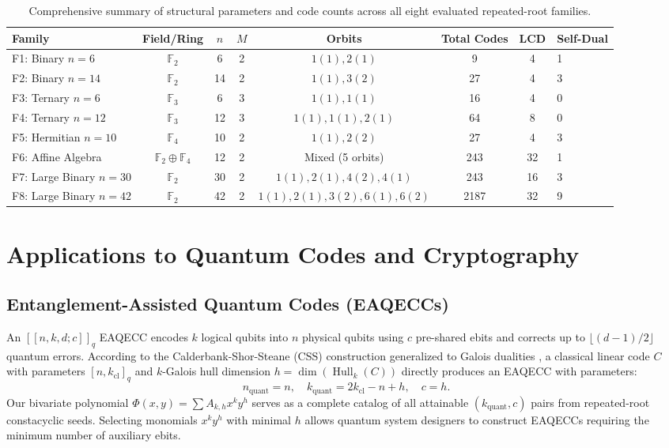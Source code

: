\documentclass[preprint,12pt]{elsarticle}
\numberwithin{equation}{section}
\theoremstyle{plain}
\theoremstyle{definition}
\theoremstyle{remark}
\begin{document}
\begin{table}[htbp]
\centering
\small
\caption{Comprehensive summary of structural parameters and code counts across all eight evaluated repeated-root families.}
\label{tab:summary_all}
\begin{tabularx}{\linewidth}{lccccccC{1.8cm}}
\toprule
\textbf{Family} & \textbf{Field/Ring} & $n$ & $M$ & \textbf{Orbits} & \textbf{Total Codes} & \textbf{LCD} & \textbf{Self-Dual} \\
\midrule
F1: Binary $n=6$ & $\mathbb{F}_2$ & 6 & 2 & $1(1), 2(1)$ & 9 & 4 & 1 \\
F2: Binary $n=14$ & $\mathbb{F}_2$ & 14 & 2 & $1(1), 3(2)$ & 27 & 4 & 3 \\
F3: Ternary $n=6$ & $\mathbb{F}_3$ & 6 & 3 & $1(1), 1(1)$ & 16 & 4 & 0 \\
F4: Ternary $n=12$ & $\mathbb{F}_3$ & 12 & 3 & $1(1), 1(1), 2(1)$ & 64 & 8 & 0 \\
F5: Hermitian $n=10$ & $\mathbb{F}_4$ & 10 & 2 & $1(1), 2(2)$ & 27 & 4 & 3 \\
F6: Affine Algebra & $\mathbb{F}_2 \oplus \mathbb{F}_4$ & 12 & 2 & Mixed (5 orbits) & 243 & 32 & 1 \\
F7: Large Binary $n=30$ & $\mathbb{F}_2$ & 30 & 2 & $1(1), 2(1), 4(2), 4(1)$ & 243 & 16 & 3 \\
F8: Large Binary $n=42$ & $\mathbb{F}_2$ & 42 & 2 & $1(1), 2(1), 3(2), 6(1), 6(2)$ & 2187 & 32 & 9 \\
\bottomrule
\end{tabularx}
\end{table}

\section{Applications to Quantum Codes and Cryptography}\label{sec:applications}

\subsection{Entanglement-Assisted Quantum Codes (EAQECCs)}
An $[[n, k, d; c]]_q$ EAQECC encodes $k$ logical qubits into $n$ physical qubits using $c$ pre-shared ebits and corrects up to $\lfloor (d-1)/2\rfloor$ quantum errors. According to the Calderbank-Shor-Steane (CSS) construction generalized to Galois dualities \cite{Brun2006,Wilde2008,Qian2018}, a classical linear code $C$ with parameters $[n, k_{\mathrm{cl}}]_q$ and $k$-Galois hull dimension $h = \dim(\operatorname{Hull}_k(C))$ directly produces an EAQECC with parameters:
\begin{equation}
    n_{\mathrm{quant}} = n, \quad k_{\mathrm{quant}} = 2 k_{\mathrm{cl}} - n + h, \quad c = h.
\end{equation}
Our bivariate polynomial $\Phi(x, y) = \sum A_{k, h} x^k y^h$ serves as a complete catalog of all attainable $(k_{\mathrm{quant}}, c)$ pairs from repeated-root constacyclic seeds. Selecting monomials $x^k y^h$ with minimal $h$ allows quantum system designers to construct EAQECCs requiring the minimum number of auxiliary ebits.
\end{document}
